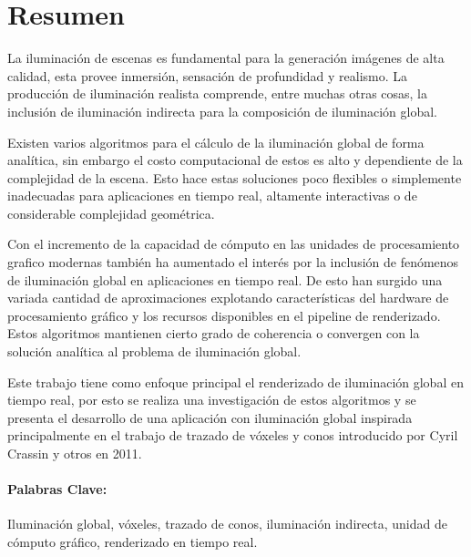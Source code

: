 \section*{Resumen}
La iluminación de escenas es fundamental para la generación imágenes de alta calidad, esta provee inmersión, sensación de profundidad y realismo. La producción de iluminación realista comprende, entre muchas otras cosas, la inclusión de iluminación indirecta para la composición de iluminación global.

Existen varios algoritmos para el cálculo de la iluminación global de forma analítica, sin embargo el costo computacional de estos es alto y dependiente de la complejidad de la escena. Esto hace estas soluciones poco flexibles o simplemente inadecuadas para aplicaciones en tiempo real, altamente interactivas o de considerable complejidad geométrica. 

Con el incremento de la capacidad de cómputo en las unidades de procesamiento grafico modernas también ha aumentado el interés por la inclusión de fenómenos de iluminación global en aplicaciones en tiempo real. De esto han surgido una variada cantidad de aproximaciones explotando características del hardware de procesamiento gráfico y los recursos disponibles en el pipeline de renderizado. Estos algoritmos mantienen cierto grado de coherencia o convergen con la solución analítica al problema de iluminación global. 

Este trabajo tiene como enfoque principal el renderizado de iluminación global en tiempo real, por esto se realiza una investigación de estos algoritmos y se presenta el desarrollo de una aplicación con iluminación global inspirada principalmente en el trabajo de trazado de vóxeles y conos introducido por Cyril Crassin y otros en 2011.
\paragraph{Palabras Clave:}
Iluminación global, vóxeles, trazado de conos, iluminación indirecta, unidad de cómputo gráfico, renderizado en tiempo real.